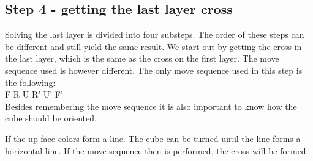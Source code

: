 \subsection{Step 4 - getting the last layer cross}\label{sub:step4}
Solving the last layer is divided into four substeps. The order of these steps can be different and still yield the same result. We start out by getting the cross in the last layer, which is the same as the cross on the first layer. The move sequence used is however different. The only move sequence used in this step is the following: \\

F R U R' U' F' \\

Besides remembering the move sequence it is also important to know how the cube should be oriented.

If the up face colors form a line. The cube can be turned until the line forms a horizontal line. If the move sequence then is performed, the cross will be formed.

\begin{figure}[htb]
	\centering
		\hspace{0.02\textwidth}
		\hspace{0.02\textwidth}
		\caption{}
		\label{fig:cross}
\end{figure}

